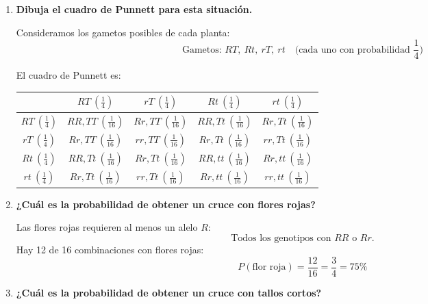 \documentclass{article}
\begin{document}
\begin{enumerate}[label=\alph*)]
    \item \textbf{Dibuja el cuadro de Punnett para esta situación.}

    Consideramos los gametos posibles de cada planta:  
    \[
    \text{Gametos: } RT,\ Rt,\ rT,\ rt \quad \text{(cada uno con probabilidad } \frac{1}{4})
    \]

    El cuadro de Punnett es:

    \begin{center}
    \renewcommand{\arraystretch}{1.3}
    \begin{tabular}{|c|c|c|c|c|}
        \hline
        & $RT\ \left(\frac{1}{4}\right)$ & $rT\ \left(\frac{1}{4}\right)$ & $Rt\ \left(\frac{1}{4}\right)$ & $rt\ \left(\frac{1}{4}\right)$ \\
        \hline
        $RT\ \left(\frac{1}{4}\right)$ & $RR,TT\ \left(\frac{1}{16}\right)$ & $Rr,TT\ \left(\frac{1}{16}\right)$ & $RR,Tt\ \left(\frac{1}{16}\right)$ & $Rr,Tt\ \left(\frac{1}{16}\right)$ \\
        \hline
        $rT\ \left(\frac{1}{4}\right)$ & $Rr,TT\ \left(\frac{1}{16}\right)$ & $rr,TT\ \left(\frac{1}{16}\right)$ & $Rr,Tt\ \left(\frac{1}{16}\right)$ & $rr,Tt\ \left(\frac{1}{16}\right)$ \\
        \hline
        $Rt\ \left(\frac{1}{4}\right)$ & $RR,Tt\ \left(\frac{1}{16}\right)$ & $Rr,Tt\ \left(\frac{1}{16}\right)$ & $RR,tt\ \left(\frac{1}{16}\right)$ & $Rr,tt\ \left(\frac{1}{16}\right)$ \\
        \hline
        $rt\ \left(\frac{1}{4}\right)$ & $Rr,Tt\ \left(\frac{1}{16}\right)$ & $rr,Tt\ \left(\frac{1}{16}\right)$ & $Rr,tt\ \left(\frac{1}{16}\right)$ & $rr,tt\ \left(\frac{1}{16}\right)$ \\
        \hline
    \end{tabular}
    \end{center}

    \item \textbf{¿Cuál es la probabilidad de obtener un cruce con flores rojas?}

    Las flores rojas requieren al menos un alelo $R$:
    \[
    \text{Todos los genotipos con } RR \text{ o } Rr.
    \]
    Hay 12 de 16 combinaciones con flores rojas:
    \[
    P(\text{flor roja}) = \frac{12}{16} = \frac{3}{4} = 75\%
    \]

    \item \textbf{¿Cuál es la probabilidad de obtener un cruce con tallos cortos?}


\end{enumerate}
\end{document}
